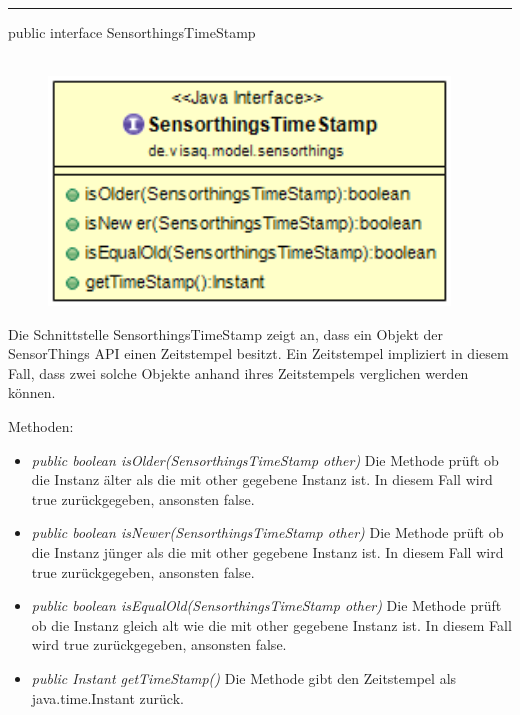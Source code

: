 \rule{\textwidth}{0.4pt}
public interface SensorthingsTimeStamp
\\\\
\begin{minipage}{0.4\textwidth}
    \begin{figure}[H]
        {\centering\includegraphics[width=0.95\textwidth]{media/backend/modell/classes/SensorthingsTimeStamp.png}}
    \end{figure}
    \end{minipage} \hfill
\begin{minipage}{0.6\textwidth}
Die Schnittstelle SensorthingsTimeStamp zeigt an, dass ein Objekt der \gls{SensorThings API} einen Zeitstempel besitzt.
Ein Zeitstempel impliziert in diesem Fall, dass zwei solche Objekte anhand ihres Zeitstempels verglichen werden können.
\end{minipage}

Methoden: \begin{itemize}
    \item \emph{public boolean isOlder(SensorthingsTimeStamp other)} Die Methode prüft ob die Instanz älter als die mit other gegebene Instanz ist.
    In diesem Fall wird true zurückgegeben, ansonsten false.
    \item \emph{public boolean isNewer(SensorthingsTimeStamp other)} Die Methode prüft ob die Instanz jünger als die mit other gegebene Instanz ist.
    In diesem Fall wird true zurückgegeben, ansonsten false.
    \item \emph{public boolean isEqualOld(SensorthingsTimeStamp other)} Die Methode prüft ob die Instanz gleich alt wie die mit other gegebene Instanz ist.
    In diesem Fall wird true zurückgegeben, ansonsten false.
    \item \emph{public Instant getTimeStamp()} Die Methode gibt den Zeitstempel als java.time.Instant zurück.
\end{itemize}

